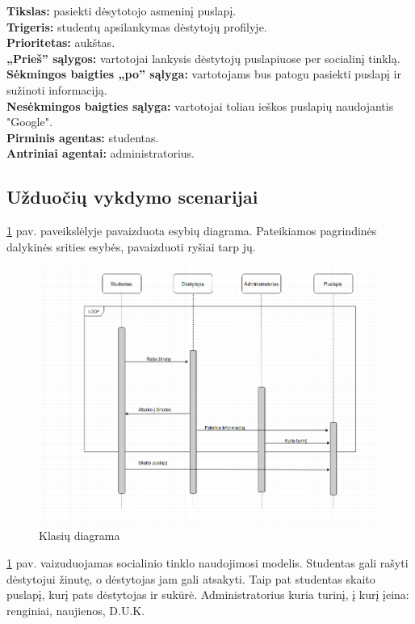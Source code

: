 \documentclass{VUMIFPSkursinis}
\begin{document}
\textbf{Tikslas:} pasiekti dėsytotojo asmeninį puslapį.\\
\textbf{Trigeris:} studentų apsilankymas dėstytojų profilyje. \\
\textbf{Prioritetas:} aukštas. \\
\textbf{„Prieš” sąlygos:} vartotojai lankysis dėstytojų puslapiuose per socialinį tinklą.\\
\textbf{Sėkmingos baigties „po” sąlyga:} vartotojams bus patogu pasiekti puslapį ir sužinoti informaciją. \\
\textbf{Nesėkmingos baigties sąlyga:} vartotojai toliau ieškos puslapių naudojantis "Google". \\
\textbf{Pirminis agentas:} studentas. \\
\textbf{Antriniai agentai:} administratorius.

\subsection{Užduočių vykdymo scenarijai}
\ref{fig:klasiu} pav. paveikslėlyje pavaizduota esybių diagrama. Pateikiamos pagrindinės dalykinės srities esybės, pavaizduoti ryšiai tarp jų.
\begin{figure}[H]
\includegraphics[width=\linewidth]{img/bendra-uml.png}
\caption{Klasių diagrama}
\label{fig:klasiu}
\end{figure}
\ref{fig:klasiu} pav. vaizuduojamas socialinio tinklo naudojimosi modelis. Studentas gali rašyti dėstytojui žinutę, o dėstytojas jam gali atsakyti. Taip pat studentas skaito puslapį, kurį pats dėstytojas ir sukūrė. Administratorius kuria turinį, į kurį įeina: renginiai, naujienos, D.U.K.
\end{document}
